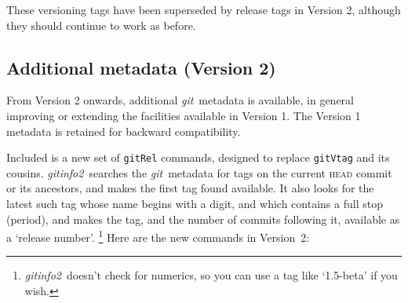 \documentclass[draft,a4paper,12pt,twoside,openany]{memoir}
\newcommand{\sfit}[1]{\textit{#1}}
\newcommand{\git}{\sfit{git}}
\newcommand{\tpname}{\sfit{gitinfo2}}
\begin{document}
These versioning tags have been superseded by release tags in Version 2,
although they should continue to work as before.

\subsection{Additional metadata (Version 2)}

From Version 2 onwards, additional \git\ metadata is available,
in general improving or extending the facilities available in Version 1.
The Version 1 metadata is retained for backward compatibility.

Included is a new set of \texttt{gitRel} commands,
designed to replace \texttt{gitVtag} and its cousins.
\tpname\ searches the \git\ metadata for tags
on the current \textsc{head} commit or its ancestors,
and makes the first tag found available.
It also looks for the latest such tag
whose name begins with a digit, and which contains a full stop (period),
and makes the tag, and the number of commits following it,
available as a `release number'.%
\footnote{\tpname\ doesn't check for numerics, so you can use a tag like `1.5-beta' if you wish.}
Here are the new commands in Version~2:
\end{document}
